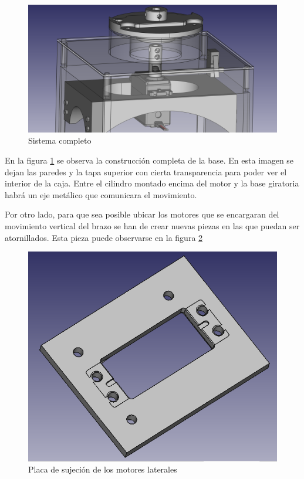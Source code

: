 \begin{figure}[H]
    \centering
    \includegraphics[width=.9\linewidth]{pictures/SistemaCompleto.png}
    \caption{Sistema completo}
    \label{fig:sistema_completo}
\end{figure}

En la figura \ref{fig:sistema_completo} se observa la construcción completa de la base. En esta imagen se dejan las paredes y la tapa superior con cierta transparencia para poder ver el interior de la caja. Entre el cilindro montado encima del motor y la base giratoria habrá un eje metálico que comunicara el movimiento.

Por otro lado, para que sea posible ubicar los motores que se encargaran del movimiento vertical del brazo se han de crear nuevas piezas en las que puedan ser atornillados. Esta pieza puede observarse en la figura \ref{fig:pletina_sujecion_motor}

\begin{figure}[H]
    \centering
    \includegraphics[width=.9\linewidth]{pictures/pletina_motor.png}
    \caption{Placa de sujeción de los motores laterales}
    \label{fig:pletina_sujecion_motor}
\end{figure}

